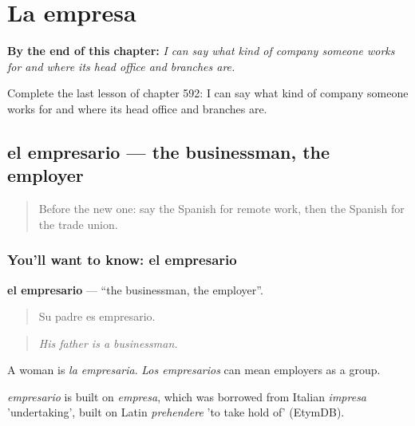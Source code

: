 
\chapter{La empresa}
\label{ch:es-la-empresa}

\begin{chapteropening}
\textbf{By the end of this chapter:} \emph{I can say what kind of company someone works for and where its head office and branches are.}

Complete the last lesson of chapter 592: I can say what kind of company someone works for and where its head office and branches are.
\end{chapteropening}

\section[el empresario]{el empresario — the businessman, the employer}

\label{lesson:ES-C592-empresario}



\begin{quote}
Before the new one: say the Spanish for remote work, then the Spanish for the trade union.
\end{quote}

\subsection*{You'll want to know: el empresario}
\textbf{el empresario} — \textquotedblleft{}the businessman, the employer\textquotedblright{}.

\begin{quote}
Su padre es empresario.
\end{quote}

\begin{quote}
\emph{His father is a businessman.}
\end{quote}

A woman is \emph{la empresaria}. \emph{Los empresarios} can mean employers as a group.

\begin{cousinweb}
\emph{empresario} is built on \emph{empresa}, which was borrowed from Italian \emph{impresa} 'undertaking', built on Latin \emph{prehendere} 'to take hold of' (EtymDB).
\end{cousinweb}

